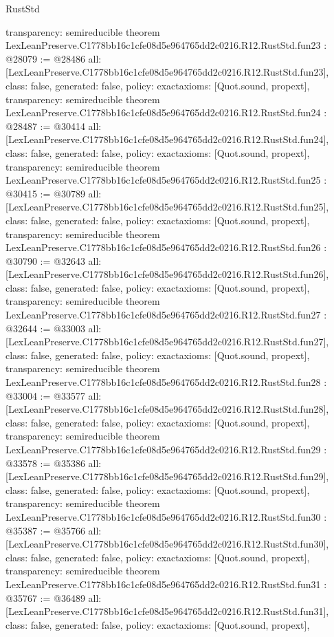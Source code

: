 \begin{lexlean}{RustStd}
\begin{coremodule}
{  transparency: semireducible
}
theorem LexLeanPreserve.C1778bb16c1cfe08d5e964765dd2c0216.R12.RustStd.fun23 : @28079 := @28486 {
  all: [LexLeanPreserve.C1778bb16c1cfe08d5e964765dd2c0216.R12.RustStd.fun23],
  class: false,
  generated: false,
  policy: exact{axioms: [Quot.sound, propext]},
  transparency: semireducible
}
theorem LexLeanPreserve.C1778bb16c1cfe08d5e964765dd2c0216.R12.RustStd.fun24 : @28487 := @30414 {
  all: [LexLeanPreserve.C1778bb16c1cfe08d5e964765dd2c0216.R12.RustStd.fun24],
  class: false,
  generated: false,
  policy: exact{axioms: [Quot.sound, propext]},
  transparency: semireducible
}
theorem LexLeanPreserve.C1778bb16c1cfe08d5e964765dd2c0216.R12.RustStd.fun25 : @30415 := @30789 {
  all: [LexLeanPreserve.C1778bb16c1cfe08d5e964765dd2c0216.R12.RustStd.fun25],
  class: false,
  generated: false,
  policy: exact{axioms: [Quot.sound, propext]},
  transparency: semireducible
}
theorem LexLeanPreserve.C1778bb16c1cfe08d5e964765dd2c0216.R12.RustStd.fun26 : @30790 := @32643 {
  all: [LexLeanPreserve.C1778bb16c1cfe08d5e964765dd2c0216.R12.RustStd.fun26],
  class: false,
  generated: false,
  policy: exact{axioms: [Quot.sound, propext]},
  transparency: semireducible
}
theorem LexLeanPreserve.C1778bb16c1cfe08d5e964765dd2c0216.R12.RustStd.fun27 : @32644 := @33003 {
  all: [LexLeanPreserve.C1778bb16c1cfe08d5e964765dd2c0216.R12.RustStd.fun27],
  class: false,
  generated: false,
  policy: exact{axioms: [Quot.sound, propext]},
  transparency: semireducible
}
theorem LexLeanPreserve.C1778bb16c1cfe08d5e964765dd2c0216.R12.RustStd.fun28 : @33004 := @33577 {
  all: [LexLeanPreserve.C1778bb16c1cfe08d5e964765dd2c0216.R12.RustStd.fun28],
  class: false,
  generated: false,
  policy: exact{axioms: [Quot.sound, propext]},
  transparency: semireducible
}
theorem LexLeanPreserve.C1778bb16c1cfe08d5e964765dd2c0216.R12.RustStd.fun29 : @33578 := @35386 {
  all: [LexLeanPreserve.C1778bb16c1cfe08d5e964765dd2c0216.R12.RustStd.fun29],
  class: false,
  generated: false,
  policy: exact{axioms: [Quot.sound, propext]},
  transparency: semireducible
}
theorem LexLeanPreserve.C1778bb16c1cfe08d5e964765dd2c0216.R12.RustStd.fun30 : @35387 := @35766 {
  all: [LexLeanPreserve.C1778bb16c1cfe08d5e964765dd2c0216.R12.RustStd.fun30],
  class: false,
  generated: false,
  policy: exact{axioms: [Quot.sound, propext]},
  transparency: semireducible
}
theorem LexLeanPreserve.C1778bb16c1cfe08d5e964765dd2c0216.R12.RustStd.fun31 : @35767 := @36489 {
  all: [LexLeanPreserve.C1778bb16c1cfe08d5e964765dd2c0216.R12.RustStd.fun31],
  class: false,
  generated: false,
  policy: exact{axioms: [Quot.sound, propext]},
}
\end{coremodule}
\end{lexlean}
